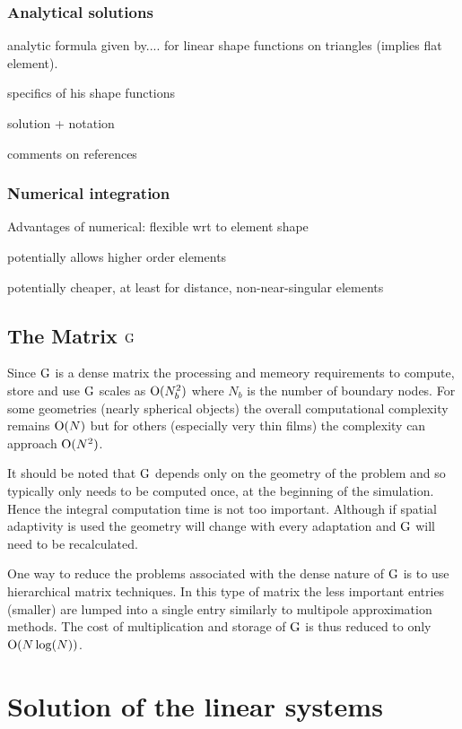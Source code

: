 \subsubsection{Analytical solutions}

analytic formula given by.... for linear shape functions on triangles (implies flat element).

specifics of his shape functions

solution + notation

comments on references


\subsubsection{Numerical integration}

Advantages of numerical: flexible wrt to element shape

potentially allows higher order elements

potentially cheaper, at least for distance, non-near-singular elements



\subsection{The Matrix ${\mathbf{\mathrm{G}}}$}

Since ${\mathbf{\mathrm{G}}}$ is a dense matrix the processing and memeory requirements to compute, store and use ${\mathbf{\mathrm{G}}}$ scales as $\text{O}(N_b^2)$ where $N_b$ is the number of boundary nodes. For some geometries (\eg nearly spherical objects) the overall computational complexity remains $\text{O}(N)$ but for others (especially very thin films) the complexity can approach $\text{O}(N^2)$.

It should be noted that ${\mathbf{\mathrm{G}}}$ depends only on the geometry of the problem and so typically only needs to be computed once, at the beginning of the simulation. Hence the integral computation time is not too important. Although if spatial adaptivity is used the geometry will change with every adaptation and ${\mathbf{\mathrm{G}}}$ will need to be recalculated.

One way to reduce the problems associated with the dense nature of ${\mathbf{\mathrm{G}}}$ is to use hierarchical matrix techniques. In this type of matrix the less important entries (\ie smaller) are lumped into a single entry similarly to multipole approximation methods. The cost of multiplication and storage of ${\mathbf{\mathrm{G}}}$ is thus reduced to only $\text{O}(N \log(N))$.\cite{Knittel2009}


\section{Solution of the linear systems}
\label{sec:solution-strategies}

